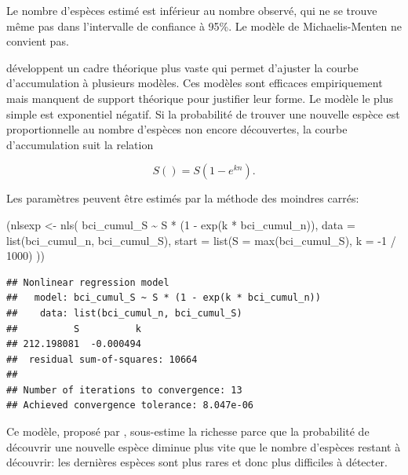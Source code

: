 \documentclass[
  11pt,
  american,
  a4paper,
  extrafontsizes,onecolumn,openright
  ]{memoir}
\newenvironment{Shaded}{\begin{snugshade}}{\end{snugshade}}
\newcommand{\AttributeTok}[1]{\textcolor[rgb]{0.77,0.63,0.00}{#1}}
\newcommand{\DecValTok}[1]{\textcolor[rgb]{0.00,0.00,0.81}{#1}}
\newcommand{\FunctionTok}[1]{\textcolor[rgb]{0.00,0.00,0.00}{#1}}
\newcommand{\NormalTok}[1]{#1}
\newcommand{\OtherTok}[1]{\textcolor[rgb]{0.56,0.35,0.01}{#1}}
\newcommand{\SpecialCharTok}[1]{\textcolor[rgb]{0.00,0.00,0.00}{#1}}
\begin{document}
\normalsize

Le nombre d'espèces estimé est inférieur au nombre observé, qui ne se trouve même pas dans l'intervalle de confiance à 95\%.
Le modèle de Michaelis-Menten ne convient pas.

\textcite{Soberon1993} développent un cadre théorique plus vaste qui permet d'ajuster la courbe d'accumulation à plusieurs modèles.
Ces modèles sont efficaces empiriquement mais manquent de support théorique pour justifier leur forme.
Le modèle le plus simple est exponentiel négatif.
Si la probabilité de trouver une nouvelle espèce est proportionnelle au nombre d'espèces non encore découvertes, la courbe d'accumulation suit la relation

\begin{equation} 
  \label{eq:Soberon1993a}
  S() = S \left( 1 - e^{kn} \right).
\end{equation}

Les paramètres peuvent être estimés par la méthode des moindres carrés:

\scriptsize

\begin{Shaded}
\begin{Highlighting}[]
\NormalTok{(nlsexp }\OtherTok{\textless{}{-}} \FunctionTok{nls}\NormalTok{(}
\NormalTok{  bci\_cumul\_S }\SpecialCharTok{\textasciitilde{}}\NormalTok{ S }\SpecialCharTok{*}\NormalTok{ (}\DecValTok{1} \SpecialCharTok{{-}} \FunctionTok{exp}\NormalTok{(k }\SpecialCharTok{*}\NormalTok{ bci\_cumul\_n)), }
  \AttributeTok{data =} \FunctionTok{list}\NormalTok{(bci\_cumul\_n, bci\_cumul\_S), }
  \AttributeTok{start =} \FunctionTok{list}\NormalTok{(}\AttributeTok{S =} \FunctionTok{max}\NormalTok{(bci\_cumul\_S), }\AttributeTok{k =} \SpecialCharTok{{-}}\DecValTok{1} \SpecialCharTok{/} \DecValTok{1000}\NormalTok{)}
\NormalTok{))}
\end{Highlighting}
\end{Shaded}

\begin{verbatim}
## Nonlinear regression model
##   model: bci_cumul_S ~ S * (1 - exp(k * bci_cumul_n))
##    data: list(bci_cumul_n, bci_cumul_S)
##          S          k 
## 212.198081  -0.000494 
##  residual sum-of-squares: 10664
## 
## Number of iterations to convergence: 13 
## Achieved convergence tolerance: 8.047e-06
\end{verbatim}

\normalsize

Ce modèle, proposé par \textcite{Holdridge1971}, sous-estime la richesse parce que la probabilité de découvrir une nouvelle espèce diminue plus vite que le nombre d'espèces restant à découvrir: les dernières espèces sont plus rares et donc plus difficiles à détecter.
\end{document}
